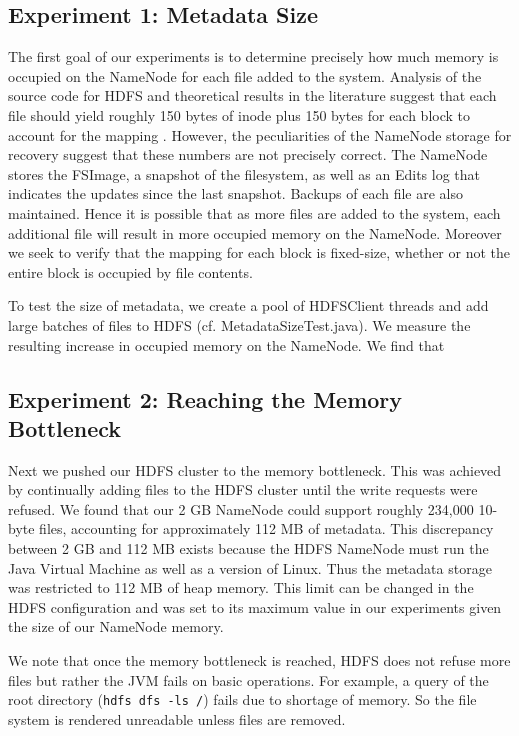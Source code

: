 \documentclass[11pt, a4paper]{article}
\begin{document}
\begin{multicols*}{2}
\subsection{Experiment 1: Metadata Size}
The first goal of our experiments is to determine precisely how much memory is occupied on the NameNode for each file added to the system. Analysis of the source code for HDFS and theoretical results in the literature suggest that each file should yield roughly 150 bytes of inode plus 150 bytes for each block to account for the mapping \cite{HdfsArch, HdfsScale}. However, the peculiarities of the NameNode storage for recovery suggest that these numbers are not precisely correct. The NameNode stores the FSImage, a snapshot of the filesystem, as well as an Edits log that indicates the updates since the last snapshot. Backups of each file are also maintained. Hence it is possible that as more files are added to the system, each additional file will result in more occupied memory on the NameNode. Moreover we seek to verify that the mapping for each block is fixed-size, whether or not the entire block is occupied by file contents.

To test the size of metadata, we create a pool of HDFSClient threads and add large batches of files to HDFS (cf. MetadataSizeTest.java). We measure the resulting increase in occupied memory on the NameNode. We find that 

\subsection{Experiment 2: Reaching the Memory Bottleneck}
Next we pushed our HDFS cluster to the memory bottleneck. This was achieved by continually adding files to the HDFS cluster until the write requests were refused. We found that our 2 GB NameNode could support roughly 234,000 10-byte files, accounting for approximately 112 MB of metadata. This discrepancy between 2 GB and 112 MB exists because the HDFS NameNode must run the Java Virtual Machine as well as a version of Linux. Thus the metadata storage was restricted to 112 MB of heap memory. This limit can be changed in the HDFS configuration and was set to its maximum value in our experiments given the size of our NameNode memory.

We note that once the memory bottleneck is reached, HDFS does not refuse more files but rather the JVM fails on basic operations. For example, a query of the root directory (\texttt{hdfs dfs -ls /}) fails due to shortage of memory. So the file system is rendered unreadable unless files are removed.


\end{multicols*}
\end{document}
